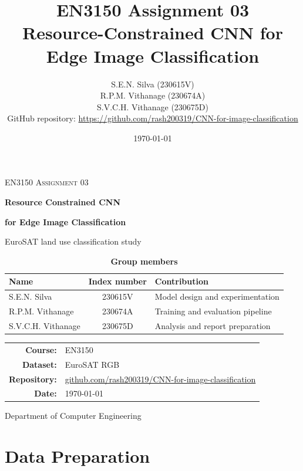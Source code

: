 \documentclass[11pt]{article}
\title{EN3150 Assignment 03 \\ \large Resource-Constrained CNN for Edge Image Classification}
\author{
  S.E.N. Silva (230615V) \\
  R.P.M. Vithanage (230674A) \\
  S.V.C.H. Vithanage (230675D) \\[0.5em]
  GitHub repository: \url{https://github.com/rash200319/CNN-for-image-classification}
}
\date{\today}
\begin{document}
\begin{titlepage}
\thispagestyle{empty}
\centering
\vspace*{1.5cm}

{\Large\textsc{EN3150 Assignment 03}\par}
\vspace{1.2cm}
{\Huge\bfseries Resource Constrained CNN\par}
\vspace{0.25cm}
{\Huge\bfseries for Edge Image Classification\par}
\vspace{1.4cm}

{\large\textcolor{diagramblue}{EuroSAT land use classification study}\par}
\vfill

\begin{table}[H]
\centering
\caption*{\large\textbf{Group members}}
\renewcommand{\arraystretch}{1.35}
\begin{tabular}{|p{1.65in}|c|p{3.15in}|}
\hline
\textbf{Name} & \textbf{Index number} & \textbf{Contribution} \\
\hline
S.E.N. Silva & 230615V & Model design and experimentation \\
\hline
R.P.M. Vithanage & 230674A & Training and evaluation pipeline \\
\hline
S.V.C.H. Vithanage & 230675D & Analysis and report preparation \\
\hline
\end{tabular}
\end{table}

\vspace{1cm}
\begin{tabular}{rl}
\textbf{Course:} & EN3150 \\
\textbf{Dataset:} & EuroSAT RGB \\
\textbf{Repository:} &
\url{github.com/rash200319/CNN-for-image-classification} \\
\textbf{Date:} & \today
\end{tabular}

\vfill
{\small Department of Computer Engineering\par}
\end{titlepage}

\tableofcontents
\clearpage
{}

\section{Data Preparation}
\end{document}
